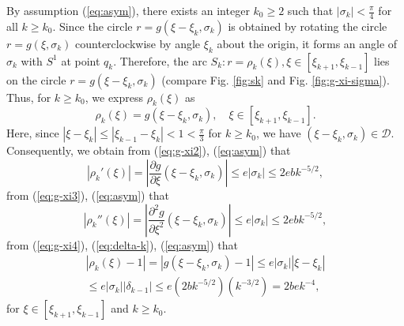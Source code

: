 \documentclass[12pt]{article}
\begin{document}
By assumption (\ref{eq:asym}), 
there exists an integer $k_0\geq 2$ such that $|\sigma_k| < \frac{\pi}{4}$ for all $k \geq k_0$.
Since the circle $r= g(\xi - \xi_k, \sigma_k)$ is obtained by rotating the circle $r= g(\xi, \sigma_k)$ counterclockwise by angle $\xi_k$ about the origin, it forms an angle of $\sigma_k$ with $S^1$ at point $q_k$. Therefore, the arc $S_k: r= \rho_k(\xi), \xi \in \left[\xi_{k+1}, \xi_{k-1}\right]$ lies on the circle $r= g(\xi - \xi_k, \sigma_k)$ 
(compare Fig. \ref{fig:sk} and Fig. \ref{fig:g-xi-sigma}).
Thus, for $k \geq k_0$, we express $\rho_k(\xi)$ as
\begin{equation}\label{eq:rho-g} 
  \rho_k(\xi) = g(\xi - \xi_k, \sigma_k), 
  \quad 
  \xi \in \left[\xi_{k+1}, \xi_{k-1}\right]. 
\end{equation}
Here, since $|\xi - \xi_{k}|\leq |\xi_{k-1}- \xi_{k}|<1<\frac{\pi}{3}$ for $k\geq k_0$, we have $(\xi - \xi_k, \sigma_k)\in \mathcal{D}$.
Consequently, we obtain from  (\ref{eq:g-xi2}), (\ref{eq:asym}) that 
\begin{equation}\label{eq:rho-xi1}
\left| \rho_k'(\xi) \right| =
\left| \frac{\partial g}{\partial \xi}(\xi-\xi_k, \sigma_k) \right| 
 \leq e \left| \sigma_k \right| \leq 2 e b k^{-5/2},
\end{equation}
from  (\ref{eq:g-xi3}), (\ref{eq:asym}) that 
\begin{equation}\label{eq:rho-xi2}
\left| \rho_k''(\xi) \right| 
= \left| \frac{\partial^2 g}{\partial \xi^2 } (\xi-\xi_k, \sigma_k) \right| 
\leq e \left| \sigma_k \right| \leq 2 e b k^{-5/2},
\end{equation}
from (\ref{eq:g-xi4}), (\ref{eq:delta-k}), (\ref{eq:asym})
that
\begin{equation}\label{eq:rho-xi3}
  \begin{split}
    \left| \rho_k(\xi) - 1 \right| 
=\left| g(\xi-\xi_k, \sigma_k) - 1 \right| 
\leq e |\sigma_k| |\xi - \xi_k| \\
\leq e |\sigma_k| |\delta_{k-1}| 
\leq e \left( 2b k^{-5/2} \right) \left( k^{-3/2} \right) 
= 2 b e k^{-4},
  \end{split}
\end{equation}
for $\xi \in \left[\xi_{k+1}, \xi_{k-1}\right]$ and $k \geq k_0$.
\end{document}
